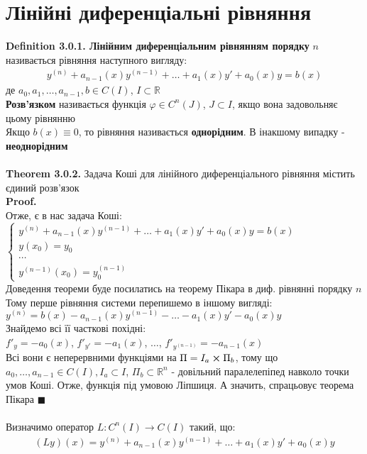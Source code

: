 \documentclass[a4paper, 14pt]{extarticle}
\def\defin#1{\textbf{Definition {#1}}}
\def\th#1{\textbf{Theorem {#1}}}
\def\proof{\textbf{Proof.}\\}
\def\bigline{\vspace{5mm}\\}
\def\qed{$\blacksquare$}
\begin{document}
	\section{Лінійні диференціальні рівняння}
	\defin{3.0.1. Лінійним диференціальним рівнянням порядку} $n$ називається рівняння наступного вигляду:
	\begin{align*}
	y^{(n)} + a_{n-1}(x)y^{(n-1)}+\dots+a_1(x)y'+a_0(x)y=b(x)
	\end{align*}
	де $a_0, a_1,\dots,a_{n-1},b \in C(I)$, $I \subset \mathbb{R}$\\
	\textbf{Розв'язком} називається функція $\varphi \in C^{n}(J)$, $J \subset I$, якщо вона задовольняє цьому рівнянню\\
	Якщо $b(x) \equiv 0$, то рівняння називається \textbf{однорідним}. В інакшому випадку - \textbf{неоднорідним}\\
	\\
	\th{3.0.2.} Задача Коші для лінійного диференціального рівняння містить єдиний розв'язок\\
	\proof
	Отже, є в нас задача Коші:\\
	$\begin{cases}
	y^{(n)} + a_{n-1}(x)y^{(n-1)}+\dots+a_1(x)y'+a_0(x)y=b(x)\\
	y(x_0) = y_0\\
	\cdots\\
	y^{(n-1)}(x_0) = y_0^{(n-1)}
	\end{cases}
	$\\
	Доведення теореми буде посилатись на теорему Пікара в диф. рівнянні порядку $n$\\
	Тому перше рівняння системи перепишемо в іншому вигляді:\\
	$y^{(n)} = b(x) - a_{n-1}(x)y^{(n-1)} - \dots - a_1(x)y' - a_0(x)y$\\
	Знайдемо всі її часткові похідні:\\
	$f'_y = -a_0(x)$, $f'_{y'} = -a_1(x)$, $\dots$, $f'_{y^{(n-1)}} = -a_{n-1}(x)$\\
	Всі вони є неперервними функціями на $\Pi = I_a \cross \Pi_b$, тому що \\$a_0,\dots,a_{n-1} \in C(I), I_a \subset I$, $\Pi_b \subset \mathbb{R}^n$ - довільний паралелепіпед навколо точки умов Коші. Отже, функція під умовою Ліпшиця. А значить, спрацьовує теорема Пікара \qed
	\\
	\bigline
	Визначимо оператор $L: C^n(I) \rightarrow C(I)$ такий, що:
	\begin{align*}
	(Ly)(x) = y^{(n)} + a_{n-1}(x)y^{(n-1)}+\dots+a_1(x)y'+a_0(x)y
	\end{align*}
\end{document}
